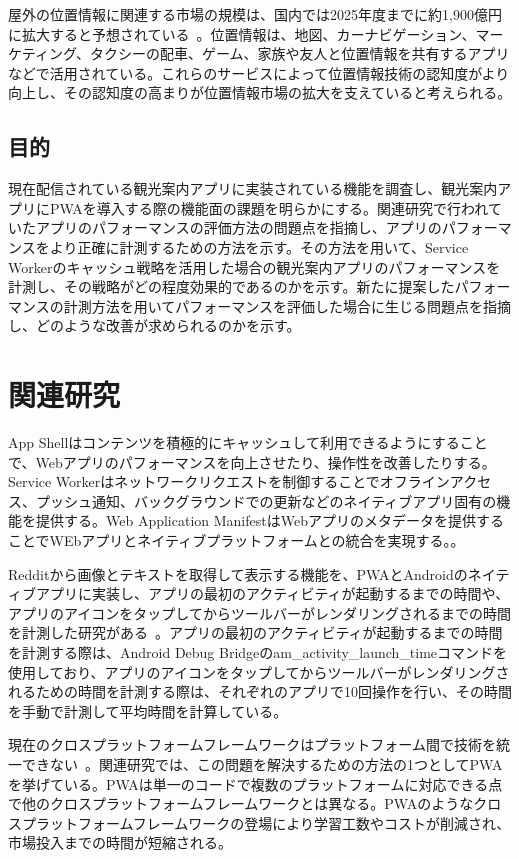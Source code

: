 \begin{multicols*}{2}
屋外の位置情報に関連する市場の規模は、国内では2025年度までに約1,900億円に拡大すると予想されている~\cite{MIC2023InformationStatistics}。位置情報は、地図、カーナビゲーション、マーケティング、タクシーの配車、ゲーム、家族や友人と位置情報を共有するアプリなどで活用されている。これらのサービスによって位置情報技術の認知度がより向上し、その認知度の高まりが位置情報市場の拡大を支えていると考えられる。
\subsection{目的}
現在配信されている観光案内アプリに実装されている機能を調査し、観光案内アプリにPWAを導入する際の機能面の課題を明らかにする。関連研究で行われていたアプリのパフォーマンスの評価方法の問題点を指摘し、アプリのパフォーマンスをより正確に計測するための方法を示す。その方法を用いて、Service Workerのキャッシュ戦略を活用した場合の観光案内アプリのパフォーマンスを計測し、その戦略がどの程度効果的であるのかを示す。新たに提案したパフォーマンスの計測方法を用いてパフォーマンスを評価した場合に生じる問題点を指摘し、どのような改善が求められるのかを示す。
\section{関連研究}
App Shellはコンテンツを積極的にキャッシュして利用できるようにすることで、Webアプリのパフォーマンスを向上させたり、操作性を改善したりする。Service Workerはネットワークリクエストを制御することでオフラインアクセス、プッシュ通知、バックグラウンドでの更新などのネイティブアプリ固有の機能を提供する。Web Application ManifestはWebアプリのメタデータを提供することでWEbアプリとネイティブプラットフォームとの統合を実現する。\cite{Tandel2018ProgressiveWebApps}。

Redditから画像とテキストを取得して表示する機能を、PWAとAndroidのネイティブアプリに実装し、アプリの最初のアクティビティが起動するまでの時間や、アプリのアイコンをタップしてからツールバーがレンダリングされるまでの時間を計測した研究がある~\cite{Andreas2018ProgressiveWebApps}。アプリの最初のアクティビティが起動するまでの時間を計測する際は、Android Debug Bridgeのam\_activity\_launch\_timeコマンドを使用しており、アプリのアイコンをタップしてからツールバーがレンダリングされるための時間を計測する際は、それぞれのアプリで10回操作を行い、その時間を手動で計測して平均時間を計算している。

現在のクロスプラットフォームフレームワークはプラットフォーム間で技術を統一できない~\cite{Majchrzak2018ProgressiveWebApps}。関連研究では、この問題を解決するための方法の1つとしてPWAを挙げている。PWAは単一のコードで複数のプラットフォームに対応できる点で他のクロスプラットフォームフレームワークとは異なる。PWAのようなクロスプラットフォームフレームワークの登場により学習工数やコストが削減され、市場投入までの時間が短縮される。


\end{multicols*}
